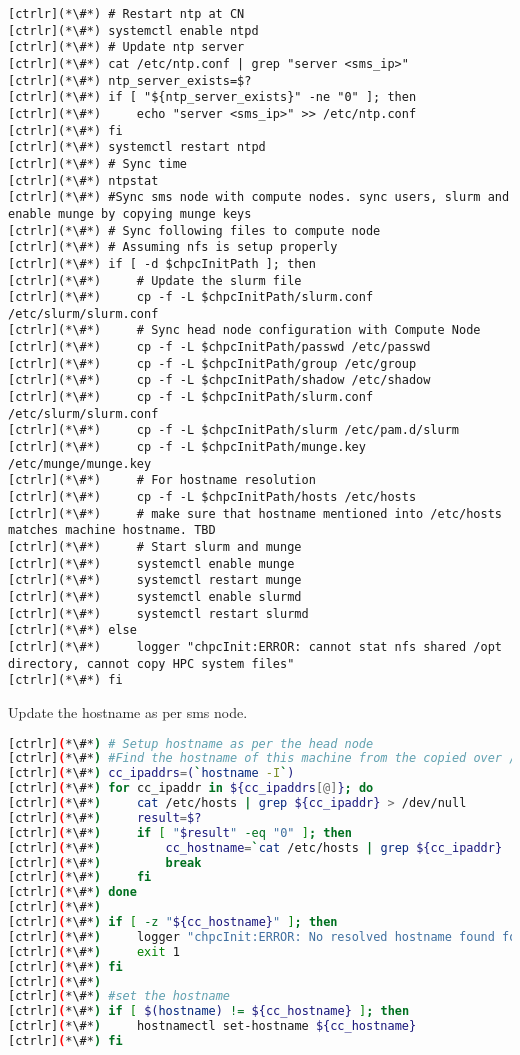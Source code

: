 \begin{lstlisting}
[ctrlr](*\#*) # Restart ntp at CN
[ctrlr](*\#*) systemctl enable ntpd
[ctrlr](*\#*) # Update ntp server
[ctrlr](*\#*) cat /etc/ntp.conf | grep "server <sms_ip>"
[ctrlr](*\#*) ntp_server_exists=$?
[ctrlr](*\#*) if [ "${ntp_server_exists}" -ne "0" ]; then
[ctrlr](*\#*)     echo "server <sms_ip>" >> /etc/ntp.conf
[ctrlr](*\#*) fi
[ctrlr](*\#*) systemctl restart ntpd
[ctrlr](*\#*) # Sync time
[ctrlr](*\#*) ntpstat
[ctrlr](*\#*) #Sync sms node with compute nodes. sync users, slurm and enable munge by copying munge keys
[ctrlr](*\#*) # Sync following files to compute node
[ctrlr](*\#*) # Assuming nfs is setup properly
[ctrlr](*\#*) if [ -d $chpcInitPath ]; then
[ctrlr](*\#*)     # Update the slurm file
[ctrlr](*\#*)     cp -f -L $chpcInitPath/slurm.conf /etc/slurm/slurm.conf
[ctrlr](*\#*)     # Sync head node configuration with Compute Node
[ctrlr](*\#*)     cp -f -L $chpcInitPath/passwd /etc/passwd
[ctrlr](*\#*)     cp -f -L $chpcInitPath/group /etc/group
[ctrlr](*\#*)     cp -f -L $chpcInitPath/shadow /etc/shadow
[ctrlr](*\#*)     cp -f -L $chpcInitPath/slurm.conf /etc/slurm/slurm.conf
[ctrlr](*\#*)     cp -f -L $chpcInitPath/slurm /etc/pam.d/slurm
[ctrlr](*\#*)     cp -f -L $chpcInitPath/munge.key /etc/munge/munge.key
[ctrlr](*\#*)     # For hostname resolution
[ctrlr](*\#*)     cp -f -L $chpcInitPath/hosts /etc/hosts
[ctrlr](*\#*)     # make sure that hostname mentioned into /etc/hosts matches machine hostname. TBD
[ctrlr](*\#*)     # Start slurm and munge 
[ctrlr](*\#*)     systemctl enable munge
[ctrlr](*\#*)     systemctl restart munge
[ctrlr](*\#*)     systemctl enable slurmd
[ctrlr](*\#*)     systemctl restart slurmd
[ctrlr](*\#*) else
[ctrlr](*\#*)     logger "chpcInit:ERROR: cannot stat nfs shared /opt directory, cannot copy HPC system files"
[ctrlr](*\#*) fi
\end{lstlisting}
Update the hostname as per sms node.


\begin{lstlisting}[language=bash,keywords={}]
[ctrlr](*\#*) # Setup hostname as per the head node
[ctrlr](*\#*) #Find the hostname of this machine from the copied over /etc/hosts file
[ctrlr](*\#*) cc_ipaddrs=(`hostname -I`)
[ctrlr](*\#*) for cc_ipaddr in ${cc_ipaddrs[@]}; do
[ctrlr](*\#*)     cat /etc/hosts | grep ${cc_ipaddr} > /dev/null
[ctrlr](*\#*)     result=$?
[ctrlr](*\#*)     if [ "$result" -eq "0" ]; then
[ctrlr](*\#*)         cc_hostname=`cat /etc/hosts | grep ${cc_ipaddr} | cut -d$'\t' -f2`
[ctrlr](*\#*)         break
[ctrlr](*\#*)     fi
[ctrlr](*\#*) done
[ctrlr](*\#*) 
[ctrlr](*\#*) if [ -z "${cc_hostname}" ]; then
[ctrlr](*\#*)     logger "chpcInit:ERROR: No resolved hostname found for any IP address in /etc/hosts"
[ctrlr](*\#*)     exit 1
[ctrlr](*\#*) fi
[ctrlr](*\#*) 
[ctrlr](*\#*) #set the hostname
[ctrlr](*\#*) if [ $(hostname) != ${cc_hostname} ]; then
[ctrlr](*\#*)     hostnamectl set-hostname ${cc_hostname}
[ctrlr](*\#*) fi
\end{lstlisting}

